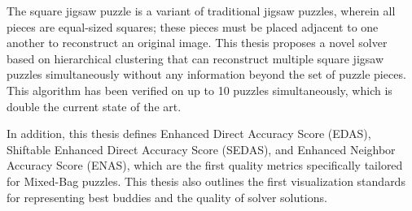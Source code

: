 The square jigsaw puzzle is a variant of traditional jigsaw puzzles, wherein all pieces are equal-sized squares; these pieces must be placed adjacent to one another to reconstruct an original image.  This thesis proposes a novel solver based on hierarchical clustering that can reconstruct multiple square jigsaw puzzles simultaneously without any information beyond the set of puzzle pieces.  This algorithm has been verified on up to 10 puzzles simultaneously, which is double the current state of the art.

In addition, this thesis defines Enhanced Direct Accuracy Score (EDAS), Shiftable Enhanced Direct Accuracy Score (SEDAS), and Enhanced Neighbor Accuracy Score (ENAS), which are the first quality metrics specifically tailored for Mixed-Bag puzzles.  This thesis also outlines the first visualization standards for representing best buddies and the quality of solver solutions.
